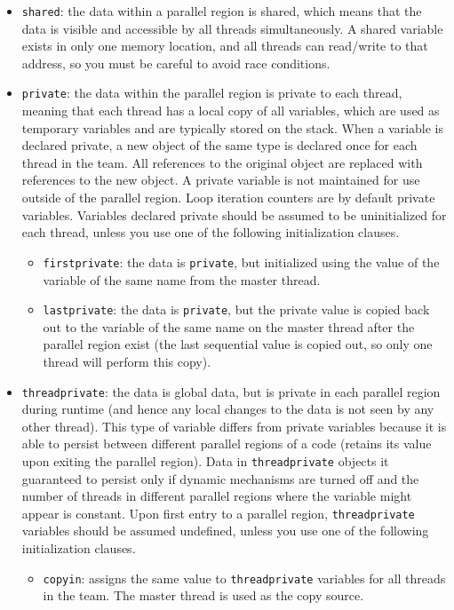 \documentclass[10pt]{article}
\begin{document}
\begin{flushleft}
\begin{itemize}
\item {\tt shared}: the data within a parallel region is shared, which means that the data is visible and accessible by all threads simultaneously. A shared variable exists in only one memory location, and all threads can read/write to that address, so you must be careful to avoid race conditions.
\item {\tt private}: the data within the parallel region is private to each thread, meaning that each thread has a local copy of all variables, which are used as temporary variables and are typically stored on the stack. When a variable is declared private, a new object of the same type is declared once for each thread in the team. All references to the original object are replaced with references to the new object. A private variable is not maintained for use outside of the parallel region. Loop iteration counters are by default private variables. Variables declared private should be assumed to be uninitialized for each thread, unless you use one of the following initialization clauses.
	\begin{itemize}
		\item {\tt firstprivate}: the data is {\tt private}, but initialized using the value of the variable of the same name from the master thread.
		 \item {\tt lastprivate}: the data is {\tt private}, but the private value is copied back out to the variable of the same name on the master thread after the parallel region exist (the last sequential value is copied out, so only one thread will perform this copy).
	\end{itemize}
\item {\tt threadprivate}: the data is global data, but is private in each parallel region during runtime (and hence any local changes to the data is not seen by any other thread). This type of variable differs from private variables because it is able to persist between different parallel regions of a code (retains its value upon exiting the parallel region). Data in {\tt threadprivate} objects it guaranteed to persist only if dynamic mechanisms are turned off and the number of threads in different parallel regions where the variable might appear is constant. Upon first entry to a parallel region, {\tt threadprivate} variables should be assumed undefined, unless you use one of the following initialization clauses.
	\begin{itemize}
		\item {\tt copyin}: assigns the same value to {\tt threadprivate} variables for all threads in the team. The master thread is used as the copy source. 
	\end{itemize}
\end{itemize}


\end{flushleft}
\end{document}
